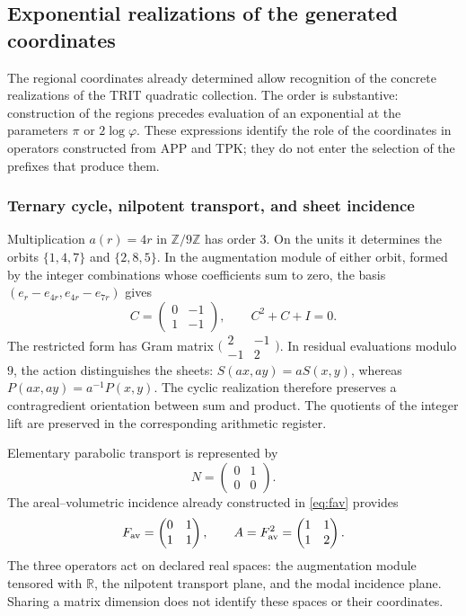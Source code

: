 \subsection{Exponential realizations of the generated coordinates}
\label{euler-trit-articulacion}

The regional coordinates already determined allow recognition of the
concrete realizations of the TRIT quadratic collection. The order is
substantive: construction of the regions precedes evaluation of an
exponential at the parameters \(\pi\) or \(2\log\varphi\). These expressions
identify the role of the coordinates in operators constructed from
APP and TPK; they do not enter the selection of the prefixes that produce them.

\subsubsection{Ternary cycle, nilpotent transport, and sheet incidence}

Multiplication \(a(r)=4r\) in \(\mathbb Z/9\mathbb Z\) has order
\(3\). On the units it determines the orbits \(\{1,4,7\}\) and
\(\{2,8,5\}\). In the augmentation module of either orbit, formed by
the integer combinations whose coefficients sum to zero, the basis
\((e_r-e_{4r},e_{4r}-e_{7r})\) gives
\[
 C=\begin{pmatrix}0&-1\\1&-1\end{pmatrix},
 \qquad C^2+C+I=0.
\]
The restricted form has Gram matrix
\(\bigl(\begin{smallmatrix}2&-1\\-1&2\end{smallmatrix}\bigr)\).
In residual evaluations modulo \(9\), the action distinguishes the sheets:
\(S(ax,ay)=aS(x,y)\), whereas \(P(ax,ay)=a^{-1}P(x,y)\).
The cyclic realization therefore preserves a contragredient orientation
between sum and product. The quotients of the integer lift are preserved
in the corresponding arithmetic register.

Elementary parabolic transport is represented by
\[
 N=\begin{pmatrix}0&1\\0&0\end{pmatrix}.
\]
The areal--volumetric incidence already constructed in \eqref{eq:fav} provides
\[
 F_{\rm av}=\begin{pmatrix}0&1\\1&1\end{pmatrix},
 \qquad A=F_{\rm av}^2=\begin{pmatrix}1&1\\1&2\end{pmatrix}.
\]
The three operators act on declared real spaces: the augmentation
module tensored with \(\mathbb R\), the nilpotent transport plane, and
the modal incidence plane. Sharing a matrix dimension does not identify
these spaces or their coordinates.

